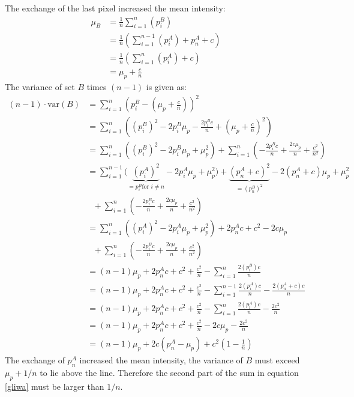 The exchange of the last pixel increased the mean intensity:
\begin{align}
\mu_B&=\frac{1}{n}\sum_{i=1}^n(p_i^B)\\
&=\frac{1}{n}\left(\sum_{i=1}^{n-1}(p_i^A) +p_n^A+c \right)\\
&=\frac{1}{n}\left(\sum_{i=1}^{n}(p_i^A) +c \right)\\
&=\mu_p + \frac{c}{n}
\end{align}
The variance of set $B$ times $(n-1)$ is given as:
\begin{align}
(n-1)\cdot\text{var}(B)&=\sum_{i=1}^n \left(p_i^B - \left(\mu_p+\frac{c}{n}\right)\right)^2\\
&=\sum_{i=1}^n \left(\left(p_i^B\right)^2 - 2p_i^B\mu_p-\frac{2p_i^Bc}{n}+\left(\mu_p+\frac{c}{n}\right)^2\right)\\
&=\sum_{i=1}^n \left(\left(p_i^B\right)^2 - 2p_i^B\mu_p+\mu_p^2\right)+\sum_{i=1}^n \left(-\frac{2p_i^Bc}{n}+\frac{2c\mu_p}{n}+\frac{c^2}{n^2}\right)\\
&=\sum_{i=1}^{n-1} \Big(\underbrace{\left(p_i^A\right)^2}_{=p_i^B \text{for } i\neq n} - 2p_i^A\mu_p+\mu_p^2\Big)+\underbrace{\left(p_n^A+c\right)^2}_{=\left(p_n^B\right)^2} -2\left(p_n^A+c\right)\mu_p + \mu_p^2 \\
&~~~+\sum_{i=1}^n\left(-\frac{2p_i^Bc}{n}+\frac{2c\mu_p}{n}+\frac{c^2}{n^2}\right) \nonumber\\
&=\sum_{i=1}^{n} \left(\left(p_i^A\right)^2 - 2p_i^A\mu_p+\mu_p^2\right)+2p_n^Ac+c^2-2c\mu_p\\
&~~~+\sum_{i=1}^n\left(-\frac{2p_i^Bc}{n}+\frac{2c\mu_p}{n}+\frac{c^2}{n^2}\right) \nonumber\\
&=(n-1)\mu_p+2p_n^Ac+c^2+\frac{c^2}{n}-\sum_{i=1}^n\frac{2\left(p_i^B\right)c}{n}\\
&=(n-1)\mu_p+2p_n^Ac+c^2+\frac{c^2}{n}-\sum_{i=1}^{n-1}\frac{2\left(p_i^A\right)c}{n} -\frac{2\left(p_n^A+c\right)c}{n}\\
&=(n-1)\mu_p+2p_n^Ac+c^2+\frac{c^2}{n}-\sum_{i=1}^{n}\frac{2\left(p_i^A\right)c}{n} -\frac{2c^2}{n}\\
&=(n-1)\mu_p+2p_n^Ac+c^2+\frac{c^2}{n}-2c\mu_p -\frac{2c^2}{n}\\
&=(n-1)\mu_p+2c\left(p_n^A-\mu_p\right)+c^2 \left(1-\frac{1}{n}\right)
\end{align}
The exchange of $p_n^A$ increased the mean intensity, the variance of $B$ must exceed $\mu_p+1/n$ to lie above the line. Therefore the second part of the sum in equation \ref{gliwa} must be larger than $1/n$.
